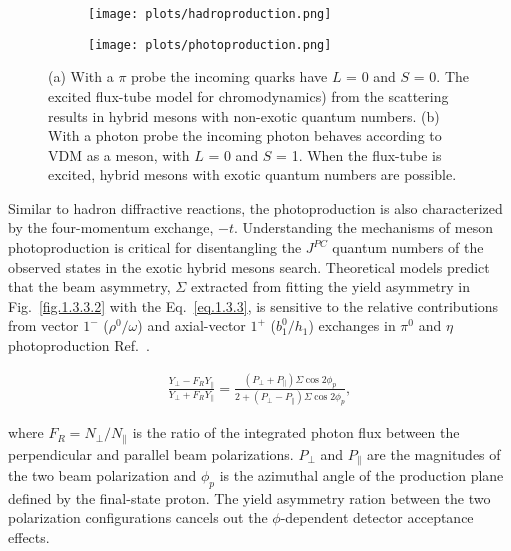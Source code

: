  \begin{figure}[H]
    \centering
    \begin{subfigure}[b]{0.4\textwidth}
        \texttt{[image: plots/hadroproduction.png]}
        \caption{}
        \label{fig.1.3.3.1.a}
    \end{subfigure}\hfill
    \begin{subfigure}[b]{0.45\textwidth}
        \texttt{[image: plots/photoproduction.png]}
        \caption{}
        \label{fig.1.3.3.1.b}
    \end{subfigure}
    \caption{(a) With a $\pi$ probe the incoming quarks have $L$ = 0 and $S$ = 0. The excited flux-tube model for chromodynamics) from the scattering results in hybrid mesons with non-exotic quantum numbers. (b) With a photon probe the incoming photon behaves according to VDM as a meson, with $L$ = 0 and $S$ = 1. When the flux-tube is excited, hybrid mesons with exotic quantum numbers are possible.}
    \label{fig.1.3.3.1}
\end{figure}

Similar to hadron diffractive reactions, the photoproduction is also characterized by the four-momentum exchange, $-t$. Understanding the mechanisms of meson photoproduction is critical for disentangling the $J^{PC}$ quantum numbers of the observed states in the exotic hybrid mesons search. Theoretical models predict that the beam asymmetry, $\Sigma$ extracted from fitting the yield asymmetry in Fig.~\ref{fig.1.3.3.2} with the Eq.~\ref{eq.1.3.3}, is sensitive to the relative contributions from vector $1^{-}$ ($\rho^{0}/\omega$) and axial-vector $1^{+}$ ($b_{1}^{0}/h_{1}$) exchanges in $\pi^{0}$ and $\eta$ photoproduction Ref.~\cite{Ghoul17}.

\begin{align}
    \frac{Y_{\perp}-F_{R}Y_{\parallel}}{Y_{\perp}+F_{R}Y_{\parallel}} = \frac{(P_{\perp}+P_{\parallel})\Sigma \cos 2\phi_{p}}{2+(P_{\perp}-P_{\parallel})\Sigma \cos 2\phi_{p}},
    \label{eq.1.3.3}
\end{align}

\noindent where $F_{R} = N_{\perp}/N_{\parallel}$ is the ratio of the integrated photon flux between the perpendicular and parallel beam polarizations. $P_{\perp}$ and $P_{\parallel}$ are the magnitudes of the two beam polarization and $\phi_{p}$ is the azimuthal angle of the production plane defined by the final-state proton. The yield asymmetry ration between the two polarization configurations cancels out the $\phi$-dependent detector acceptance effects.

